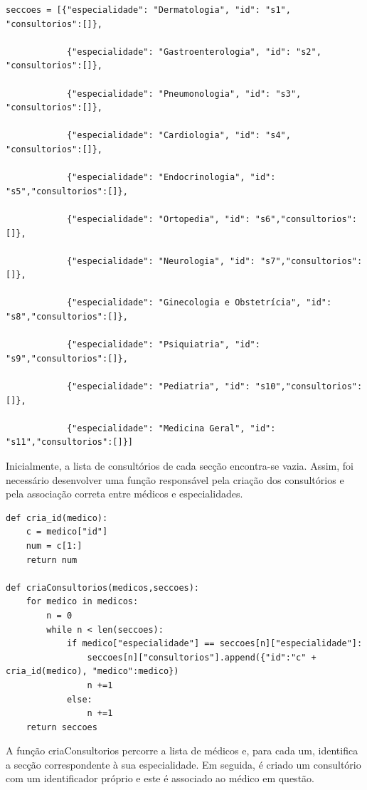 \documentclass[12pt,a4paper]{article} %
\begin{document}
\begin{verbatim}
seccoes = [{"especialidade": "Dermatologia", "id": "s1", "consultorios":[]},

            {"especialidade": "Gastroenterologia", "id": "s2", "consultorios":[]},
                                                                            
            {"especialidade": "Pneumonologia", "id": "s3", "consultorios":[]},
            
            {"especialidade": "Cardiologia", "id": "s4", "consultorios":[]},
            
            {"especialidade": "Endocrinologia", "id": "s5","consultorios":[]},
                                                                        
            {"especialidade": "Ortopedia", "id": "s6","consultorios":[]},
            
            {"especialidade": "Neurologia", "id": "s7","consultorios":[]},

            {"especialidade": "Ginecologia e Obstetrícia", "id": "s8","consultorios":[]},

            {"especialidade": "Psiquiatria", "id": "s9","consultorios":[]},

            {"especialidade": "Pediatria", "id": "s10","consultorios":[]},

            {"especialidade": "Medicina Geral", "id": "s11","consultorios":[]}]
\end{verbatim}

    Inicialmente, a lista de consultórios de cada secção encontra-se vazia. Assim, foi necessário desenvolver uma função responsável pela criação dos consultórios e pela associação correta entre médicos e especialidades.

\begin{verbatim}
def cria_id(medico):
    c = medico["id"]
    num = c[1:]
    return num

def criaConsultorios(medicos,seccoes):
    for medico in medicos:
        n = 0
        while n < len(seccoes): 
            if medico["especialidade"] == seccoes[n]["especialidade"]:
                seccoes[n]["consultorios"].append({"id":"c" + cria_id(medico), "medico":medico})
                n +=1
            else: 
                n +=1
    return seccoes
\end{verbatim}

    A função criaConsultorios percorre a lista de médicos e, para cada um, identifica a secção correspondente à sua especialidade. Em seguida, é criado um consultório com um identificador próprio e este é associado ao médico em questão.
\end{document}
